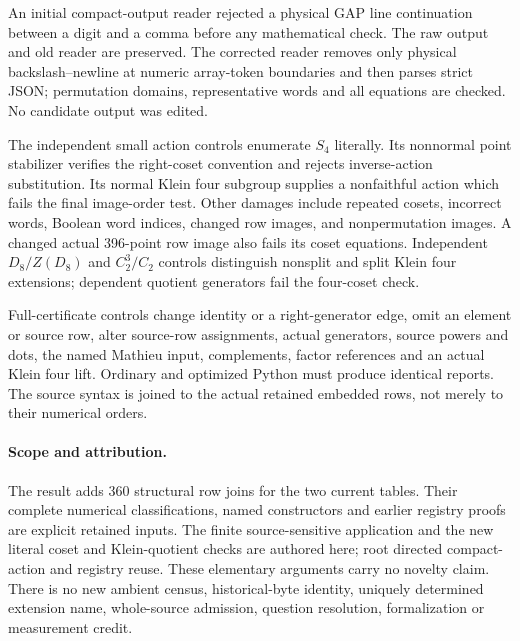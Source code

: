 \documentclass[11pt]{article}
\begin{document}
An initial compact-output reader rejected a physical GAP line continuation
between a digit and a comma before any mathematical check. The raw output
and old reader are preserved. The corrected reader removes only physical
backslash--newline at numeric array-token boundaries and then parses strict
JSON; permutation domains, representative words and all equations are checked.
No candidate output was edited.

The independent small action controls enumerate $S_4$ literally. Its
nonnormal point stabilizer verifies the right-coset convention and rejects
inverse-action substitution. Its normal Klein four subgroup supplies a
nonfaithful action which fails the final image-order test. Other damages
include repeated cosets, incorrect words, Boolean word indices, changed
row images, and nonpermutation images. A changed actual 396-point row image
also fails its coset equations. Independent $D_8/Z(D_8)$ and $C_2^3/C_2$
controls distinguish nonsplit and split Klein four extensions; dependent
quotient generators fail the four-coset check.

Full-certificate controls change identity or a right-generator edge, omit
an element or source row, alter source-row assignments, actual generators,
source powers and dots, the named Mathieu input, complements, factor
references and an actual Klein four lift. Ordinary and optimized Python
must produce identical reports. The source syntax is joined to the actual
retained embedded rows, not merely to their numerical orders.

\paragraph{Scope and attribution.}
The result adds 360 structural row joins for the two current tables.
Their complete numerical classifications, named constructors and earlier
registry proofs are explicit retained inputs. The finite source-sensitive
application and the new literal coset and Klein-quotient checks are authored
here; root directed compact-action and registry reuse. These elementary
arguments carry no novelty claim. There is no new ambient census,
historical-byte identity, uniquely determined extension name, whole-source
admission, question resolution, formalization or measurement credit.
\end{document}
